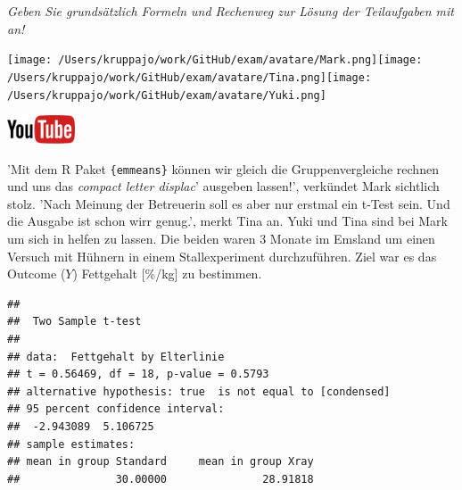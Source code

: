 \documentclass[a4paper, 9pt]{scrartcl}\usepackage[]{graphicx}\usepackage[]{xcolor}
\makeatletter
\newenvironment{kframe}{%
 \def\at@end@of@kframe{}%
 \ifinner\ifhmode%
  \def\at@end@of@kframe{\end{minipage}}%
  \begin{minipage}{\columnwidth}%
 \fi\fi%
 \def\FrameCommand##1{\hskip\@totalleftmargin \hskip-\fboxsep
 \colorbox{shadecolor}{##1}\hskip-\fboxsep
     \hskip-\linewidth \hskip-\@totalleftmargin \hskip\columnwidth}%
 \MakeFramed {\advance\hsize-\width
   \@totalleftmargin\z@ \linewidth\hsize
   \@setminipage}}%
 {\par\unskip\endMakeFramed%
 \at@end@of@kframe}
\newenvironment{knitrout}{}{} %
\makeatother
\begin{document}
\textit{Geben Sie grundsätzlich Formeln und Rechenweg zur Lösung der Teilaufgaben mit an!} \\[1Ex]
 

 
\begin{minipage}[t]{0.5\textwidth}
\texttt{[image: /Users/kruppajo/work/GitHub/exam/avatare/Mark.png]}\hspace{-4mm}\texttt{[image: /Users/kruppajo/work/GitHub/exam/avatare/Tina.png]}\hspace{-4mm}\texttt{[image: /Users/kruppajo/work/GitHub/exam/avatare/Yuki.png]}
\end{minipage}
\begin{minipage}[t]{0.5\textwidth}
\hfill
\href{https://youtu.be/wJqsNV1hOW8}{\includegraphics[width = 2cm]{img/youtube}}
\end{minipage}
\vspace{1ex}



'Mit dem R Paket \texttt{\{emmeans\}} können wir gleich die Gruppenvergleiche rechnen und uns das \textit{compact letter displac}' ausgeben lassen!', verkündet Mark sichtlich stolz. 'Nach Meinung der Betreuerin soll es aber nur erstmal ein t-Test sein. Und die Ausgabe ist schon wirr genug.', merkt Tina an. Yuki und Tina sind bei Mark um sich in \Rlogo helfen zu lassen. Die beiden waren 3 Monate im Emsland um einen Versuch mit Hühnern in einem Stallexperiment durchzuführen. Ziel war es das Outcome ($Y$) Fettgehalt [\%/kg] zu bestimmen.

\begin{knitrout}
\color{fgcolor}\begin{kframe}
\begin{verbatim}
## 
## 	Two Sample t-test
## 
## data:  Fettgehalt by Elterlinie
## t = 0.56469, df = 18, p-value = 0.5793
## alternative hypothesis: true  is not equal to [condensed]
## 95 percent confidence interval:
##  -2.943089  5.106725
## sample estimates:
## mean in group Standard     mean in group Xray 
##               30.00000               28.91818
\end{verbatim}
\end{kframe}
\end{knitrout}
\end{document}
